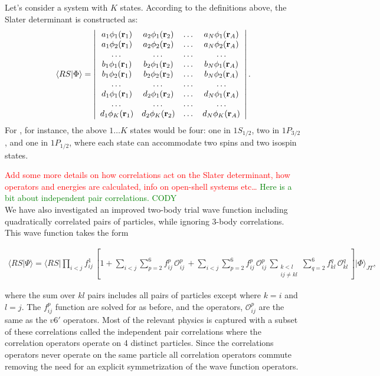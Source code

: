 \documentclass[aps,prc,twocolumn,superscriptaddress,showpacs,floatfix,nofootinbib]{revtex4-1}
\newcommand{\red}[1]{\protect\textcolor{red}{#1}}
\newcommand{\green}[1]{\protect\textcolor{green}{#1}}
\begin{document}
Let's consider a system with $K$ states. According to the definitions above, 
the Slater determinant is constructed as:
\begin{align}
\langle RS|\Phi\rangle=
\left|
\begin{array}{cccc}
a_1\phi_1(\vb{r}_1) & a_2\phi_1(\vb{r}_2) & \dots & a_N\phi_1(\vb{r}_A) \\
a_1\phi_2(\vb{r}_1) & a_2\phi_2(\vb{r}_2) & \dots & a_N\phi_2(\vb{r}_A) \\
\dots & \dots & \dots & \dots \\
b_1\phi_1(\vb{r}_1) & b_2\phi_1(\vb{r}_2) & \dots & b_N\phi_1(\vb{r}_A) \\
b_1\phi_2(\vb{r}_1) & b_2\phi_2(\vb{r}_2) & \dots & b_N\phi_2(\vb{r}_A) \\
\dots & \dots & \dots & \dots \\
d_1\phi_1(\vb{r}_1) & d_2\phi_1(\vb{r}_2) & \dots & d_N\phi_1(\vb{r}_A) \\
\dots & \dots & \dots & \dots \\
d_1\phi_K(\vb{r}_1) & d_2\phi_K(\vb{r}_2) & \dots & d_N\phi_K(\vb{r}_A) \\
\end{array}
\right| .
\nonumber
\end{align}
For , for instance, the above $1\ldots K$ states would be four: 
one in $1S_{1/2}$, two in $1P_{3/2}$, and one in $1P_{1/2}$, where each state can 
accommodate two spins and two isospin states.

\red{Add some more details on how correlations act on the Slater determinant, how
operators and energies are calculated, info on open-shell systems etc\ldots}
\green{Here is a bit about independent pair correlations. CODY \\}
We have also investigated an improved two-body trial wave function including quadratically correlated pairs of particles, while ignoring 3-body correlations. This wave function takes the form
\begin{widetext}
\begin{align}
\langle RS|\Psi\rangle=\langle RS|\prod_{i<j}f^1_{ij}\,
\left[1+\sum_{i<j}\sum_{p=2}^6 f^p_{ij}\,\mathcal O_{ij}^p\,
+\sum_{i<j}\sum_{p=2}^6 f^p_{ij}\,\mathcal O_{ij}^p\, \sum_{\substack{k<l\\ij\ne kl}}\sum_{q=2}^6 f^q_{kl}\,\mathcal O_{kl}^q\,\right]|\Phi\rangle_{JT} ,
\label{eq:psi}
\end{align}
\end{widetext}
where the sum over $kl$ pairs includes all pairs of particles except where $k=i$ and $l=j$. The $f^p_{ij}$ function are solved for as before, and the operators, $\mathcal{O}^p_{ij}$ are the same as the $v6'$ operators. Most of the relevant physics is captured with a subset of these correlations called the independent pair correlations where the correlation operators operate on 4 distinct particles. Since the correlations operators never operate on the same particle all correlation operators commute removing the need for an explicit symmetrization of the wave function operators.
\end{document}
